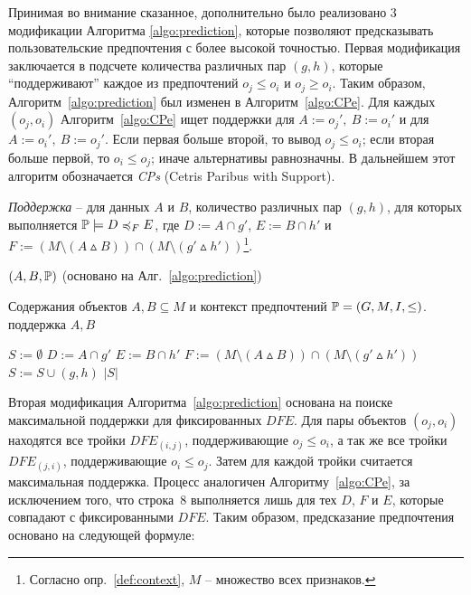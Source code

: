 		Принимая во внимание сказанное, дополнительно было реализовано 3 модификации Алгоритма \ref{algo:prediction}, которые позволяют предсказывать пользовательские предпочтения с более высокой точностью.
		Первая модификация заключается в подсчете количества различных пар $(g,h)$, которые ``поддерживают'' каждое из предпочтений $o_j \leq o_i$ и $o_j \geq o_i$. Таким образом, Алгоритм~\ref{algo:prediction} был изменен в Алгоритм~\ref{algo:CPe}. Для каждых $(o_j, o_i)$ Алгоритм~\ref{algo:CPe} ищет поддержки для $A:=o_j',\: B:=o_i'$ и для $A:=o_i',\: B:=o_j'$. Если первая больше второй, то вывод $o_j \leq o_i$; если вторая больше первой, то $o_i \leq o_j$; иначе альтернативы равнозначны. В дальнейшем этот алгоритм обозначается \emph{CPs} (Cetris Paribus with Support).
		
		\begin{definition}
			\emph{Поддержка} – для данных $A$ и $B$, количество различных пар $(g, h)$, для которых выполняется $\PP \models \DEF$, где $D := A \cap g'$, $E := B \cap h'$ и $F := (M \setminus (A \vartriangle B)) \cap (M \setminus (g' \vartriangle h'))$\footnote{Согласно опр.~\ref{def:context}, $M$ – множество всех признаков.}.
		\end{definition}
		
		\begin{algorithm}
			\caption{$(A, B, \mathbb{P})$ (основано на Алг.~\ref{algo:prediction})}
			\label{algo:CPe}
			\begin{algorithmic}[1]
				\REQUIRE Содержания объектов $A, B \subseteq M$ и контекст предпочтений $\mathbb{P} = (G, M, I, \leq)$.
				\ENSURE поддержка $A, B$
				\item[]
				\STATE $S := \emptyset$
				\STATE $D := A \cap g'$
				\STATE $E := B \cap h'$
				\STATE $F := (M \setminus (A \vartriangle B)) \cap (M \setminus (g' \vartriangle h'))$
				\IF{$\PP \models \DEF$}
				\STATE $S := S \cup (g, h)$
				\ENDIF
				\ENDFOR
				\ENDFOR
				\RETURN $|S|$
			\end{algorithmic}
		\end{algorithm}
		
		Вторая модификация Алгоритма~\ref{algo:prediction} основана на поиске максимальной поддержки для фиксированных $DFE$. Для пары объектов $(o_j, o_i)$ находятся все тройки $DFE_{(i,j)}$, поддерживающие $o_j \leq o_i$, а так же все тройки $DFE_{(j,i)}$, поддерживающие $o_i \leq o_j$. Затем для каждой тройки считается максимальная поддержка. Процесс аналогичен Алгоритму~\ref{algo:CPe}, за исключением того, что строка~8 выполняется лишь для тех $D$, $F$ и $E$, которые совпадают с фиксированными $DFE$. Таким образом, предсказание предпочтения основано на следующей формуле:
		
